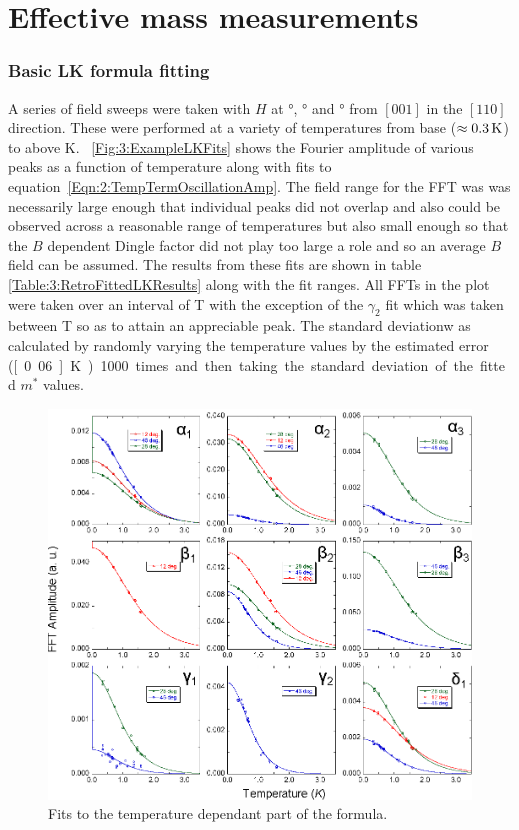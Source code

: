
\section{Effective mass measurements}


\subsubsection{Basic LK formula fitting}

A series of field sweeps were taken with $H$ at \unit[12]{\degree}, \unit[28]{\degree} and \unit[46]{\degree} from $[001]$ in the $[110]$ direction. These were performed at a variety of temperatures from base ($\approx\unit[0.3]{K}$) to above \unit[2]{K}. \Fig~\ref{Fig:3:ExampleLKFits} shows the Fourier amplitude of various peaks as a function of temperature along with fits to equation~\ref{Eqn:2:TempTermOscillationAmp}. The field range for the FFT was was necessarily large enough that individual peaks did not overlap and also could be observed across a reasonable range of temperatures but also small enough so that the $B$ dependent Dingle factor did not play too large a role and so an average $B$ field can be assumed. The results from these fits are shown in table \ref{Table:3:RetroFittedLKResults} along with the fit ranges. All FFTs in the plot were taken over an interval of \unit[12--18]{T} with the exception of the $\gamma_2$ fit which was taken between \unit[16-18]{T} so as to attain an appreciable peak. The standard deviationw as calculated by randomly varying the temperature values by the estimated error (\unit[0.06]{K}) 1000 times and then taking the standard deviation of the fitted $m^*$ values.
\begin{figure}[h!]
    \begin{center}
        \includegraphics[scale=0.9]{Chapter3-dHvABaFe2P2/Figures/Mass/SimpleLKFits/SimpleLKFits}
        \caption{Fits to the temperature dependant part of the \LK formula. }
        \label{Fig:3:SimpleLKFits}
    \end{center}
\end{figure}
